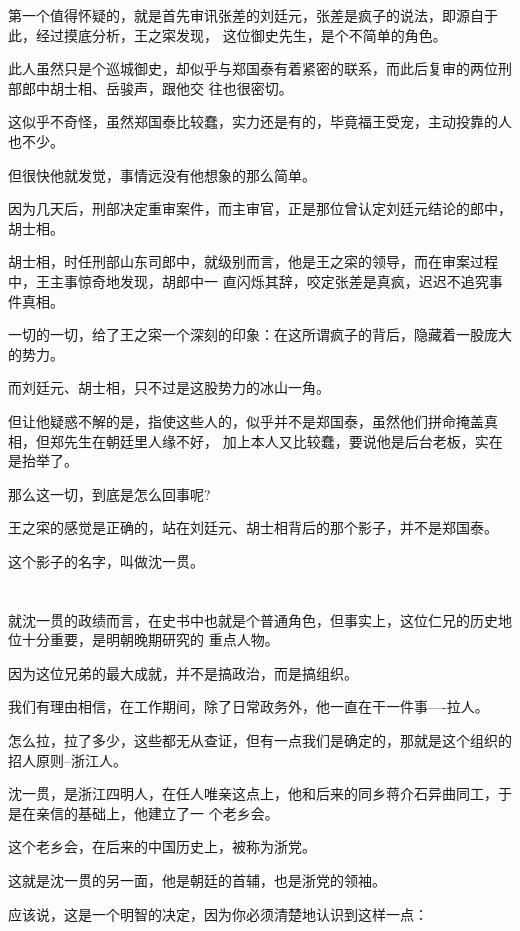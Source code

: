 \documentclass[11pt,a4paper,onecolumn]{article}
\begin{document}
第一个值得怀疑的，就是首先审讯张差的刘廷元，张差是疯子的说法，即源自于此，经过摸底分析，王之寀发现，
这位御史先生，是个不简单的角色。

此人虽然只是个巡城御史，却似乎与郑国泰有着紧密的联系，而此后复审的两位刑部郎中胡士相、岳骏声，跟他交
往也很密切。

这似乎不奇怪，虽然郑国泰比较蠢，实力还是有的，毕竟福王受宠，主动投靠的人也不少。

但很快他就发觉，事情远没有他想象的那么简单。

因为几天后，刑部决定重审案件，而主审官，正是那位曾认定刘廷元结论的郎中，胡士相。

胡士相，时任刑部山东司郎中，就级别而言，他是王之寀的领导，而在审案过程中，王主事惊奇地发现，胡郎中一
直闪烁其辞，咬定张差是真疯，迟迟不追究事件真相。

一切的一切，给了王之寀一个深刻的印象：在这所谓疯子的背后，隐藏着一股庞大的势力。

而刘廷元、胡士相，只不过是这股势力的冰山一角。

但让他疑惑不解的是，指使这些人的，似乎并不是郑国泰，虽然他们拼命掩盖真相，但郑先生在朝廷里人缘不好，
加上本人又比较蠢，要说他是后台老板，实在是抬举了。

那么这一切，到底是怎么回事呢?

王之寀的感觉是正确的，站在刘廷元、胡士相背后的那个影子，并不是郑国泰。

这个影子的名字，叫做沈一贯。

\section[\thesection]{}

就沈一贯的政绩而言，在史书中也就是个普通角色，但事实上，这位仁兄的历史地位十分重要，是明朝晚期研究的
重点人物。

因为这位兄弟的最大成就，并不是搞政治，而是搞组织。

我们有理由相信，在工作期间，除了日常政务外，他一直在干一件事----拉人。

怎么拉，拉了多少，这些都无从查证，但有一点我们是确定的，那就是这个组织的招人原则--浙江人。

沈一贯，是浙江四明人，在任人唯亲这点上，他和后来的同乡蒋介石异曲同工，于是在亲信的基础上，他建立了一
个老乡会。

这个老乡会，在后来的中国历史上，被称为浙党。

这就是沈一贯的另一面，他是朝廷的首辅，也是浙党的领袖。

应该说，这是一个明智的决定，因为你必须清楚地认识到这样一点：
\end{document}
